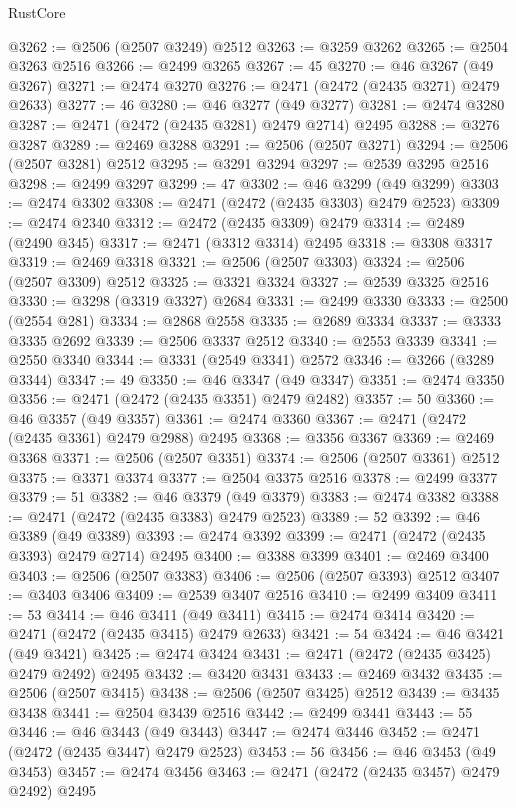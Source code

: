 \begin{lexlean}{RustCore}
\begin{coremodule}
@3262 := @2506 (@2507 @3249) @2512
@3263 := @3259 @3262
@3265 := @2504 @3263 @2516
@3266 := @2499 @3265
@3267 := 45
@3270 := @46 @3267 (@49 @3267)
@3271 := @2474 @3270
@3276 := @2471 (@2472 (@2435 @3271) @2479 @2633)
@3277 := 46
@3280 := @46 @3277 (@49 @3277)
@3281 := @2474 @3280
@3287 := @2471 (@2472 (@2435 @3281) @2479 @2714) @2495
@3288 := @3276 @3287
@3289 := @2469 @3288
@3291 := @2506 (@2507 @3271)
@3294 := @2506 (@2507 @3281) @2512
@3295 := @3291 @3294
@3297 := @2539 @3295 @2516
@3298 := @2499 @3297
@3299 := 47
@3302 := @46 @3299 (@49 @3299)
@3303 := @2474 @3302
@3308 := @2471 (@2472 (@2435 @3303) @2479 @2523)
@3309 := @2474 @2340
@3312 := @2472 (@2435 @3309) @2479
@3314 := @2489 (@2490 @345)
@3317 := @2471 (@3312 @3314) @2495
@3318 := @3308 @3317
@3319 := @2469 @3318
@3321 := @2506 (@2507 @3303)
@3324 := @2506 (@2507 @3309) @2512
@3325 := @3321 @3324
@3327 := @2539 @3325 @2516
@3330 := @3298 (@3319 @3327) @2684
@3331 := @2499 @3330
@3333 := @2500 (@2554 @281)
@3334 := @2868 @2558
@3335 := @2689 @3334
@3337 := @3333 @3335 @2692
@3339 := @2506 @3337 @2512
@3340 := @2553 @3339
@3341 := @2550 @3340
@3344 := @3331 (@2549 @3341) @2572
@3346 := @3266 (@3289 @3344)
@3347 := 49
@3350 := @46 @3347 (@49 @3347)
@3351 := @2474 @3350
@3356 := @2471 (@2472 (@2435 @3351) @2479 @2482)
@3357 := 50
@3360 := @46 @3357 (@49 @3357)
@3361 := @2474 @3360
@3367 := @2471 (@2472 (@2435 @3361) @2479 @2988) @2495
@3368 := @3356 @3367
@3369 := @2469 @3368
@3371 := @2506 (@2507 @3351)
@3374 := @2506 (@2507 @3361) @2512
@3375 := @3371 @3374
@3377 := @2504 @3375 @2516
@3378 := @2499 @3377
@3379 := 51
@3382 := @46 @3379 (@49 @3379)
@3383 := @2474 @3382
@3388 := @2471 (@2472 (@2435 @3383) @2479 @2523)
@3389 := 52
@3392 := @46 @3389 (@49 @3389)
@3393 := @2474 @3392
@3399 := @2471 (@2472 (@2435 @3393) @2479 @2714) @2495
@3400 := @3388 @3399
@3401 := @2469 @3400
@3403 := @2506 (@2507 @3383)
@3406 := @2506 (@2507 @3393) @2512
@3407 := @3403 @3406
@3409 := @2539 @3407 @2516
@3410 := @2499 @3409
@3411 := 53
@3414 := @46 @3411 (@49 @3411)
@3415 := @2474 @3414
@3420 := @2471 (@2472 (@2435 @3415) @2479 @2633)
@3421 := 54
@3424 := @46 @3421 (@49 @3421)
@3425 := @2474 @3424
@3431 := @2471 (@2472 (@2435 @3425) @2479 @2492) @2495
@3432 := @3420 @3431
@3433 := @2469 @3432
@3435 := @2506 (@2507 @3415)
@3438 := @2506 (@2507 @3425) @2512
@3439 := @3435 @3438
@3441 := @2504 @3439 @2516
@3442 := @2499 @3441
@3443 := 55
@3446 := @46 @3443 (@49 @3443)
@3447 := @2474 @3446
@3452 := @2471 (@2472 (@2435 @3447) @2479 @2523)
@3453 := 56
@3456 := @46 @3453 (@49 @3453)
@3457 := @2474 @3456
@3463 := @2471 (@2472 (@2435 @3457) @2479 @2492) @2495

\end{coremodule}
\end{lexlean}
